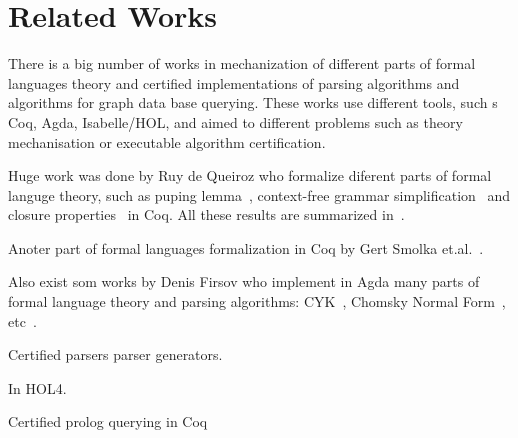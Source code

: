 \section{Related Works}

There is a big number of works in mechanization of different parts of formal languages theory and certified implementations of parsing algorithms and algorithms for graph data base querying. These works use different tools, such s Coq, Agda, Isabelle/HOL, and aimed to different problems such as theory mechanisation or executable algorithm certification.

Huge work was done by Ruy de Queiroz who formalize diferent parts of formal languge theory, such as puping lemma~\cite{ramos2015formalization}, context-free grammar simplification~\cite{ramos2015formalization} and closure properties~\cite{ramos2015formalizationClosure} in Coq.
All these results are summarized in~\cite{ramos2016formalization}. 

Anoter part of formal languages formalization in Coq by Gert Smolka et.al.~\cite{smolka2017regular, smolka2013regular}.

Also exist som works by Denis Firsov who implement in Agda many parts of formal language theory and parsing algorithms: CYK~\cite{firsov2014certified}, Chomsky Normal Form~\cite{firsov2015certified}, etc~\cite{firsov2016cfl}.

Certified parsers parser generators.


In HOL4.

Certified prolog querying in Coq~\cite{certifiedPrologGraphQuerying} 


